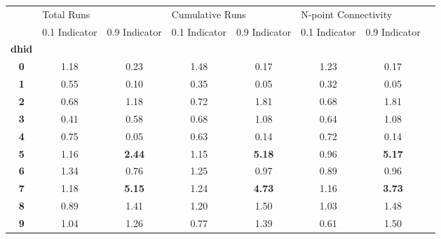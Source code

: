 \begin{tabular}{cccccccc}
    \toprule
    {}            & \multicolumn{2}{l}{Total Runs} & \multicolumn{2}{l}{Cumulative Runs} & \multicolumn{2}{l}{N-point Connectivity}                                                 \\
    {}            & 0.1 Indicator                  & 0.9 Indicator                       & 0.1 Indicator                            & 0.9 Indicator & 0.1 Indicator & 0.9 Indicator \\
    \textbf{dhid} &                                &                                     &                                          &               &               &               \\
    \midrule
    \textbf{0   } & 1.18                           & 0.23                                & 1.48                                     & 0.17          & 1.23          & 0.17          \\
    \textbf{1   } & 0.55                           & 0.10                                & 0.35                                     & 0.05          & 0.32          & 0.05          \\
    \textbf{2   } & 0.68                           & 1.18                                & 0.72                                     & 1.81          & 0.68          & 1.81          \\
    \textbf{3   } & 0.41                           & 0.58                                & 0.68                                     & 1.08          & 0.64          & 1.08          \\
    \textbf{4   } & 0.75                           & 0.05                                & 0.63                                     & 0.14          & 0.72          & 0.14          \\
    \textbf{5   } & 1.16                           & \textbf{2.44}                       & 1.15                                     & \textbf{5.18} & 0.96          & \textbf{5.17} \\
    \textbf{6   } & 1.34                           & 0.76                                & 1.25                                     & 0.97          & 0.89          & 0.96          \\
    \textbf{7   } & 1.18                           & \textbf{5.15}                       & 1.24                                     & \textbf{4.73} & 1.16          & \textbf{3.73} \\
    \textbf{8   } & 0.89                           & 1.41                                & 1.20                                     & 1.50          & 1.03          & 1.48          \\
    \textbf{9   } & 1.04                           & 1.26                                & 0.77                                     & 1.39          & 0.61          & 1.50          \\
    \bottomrule
\end{tabular}
